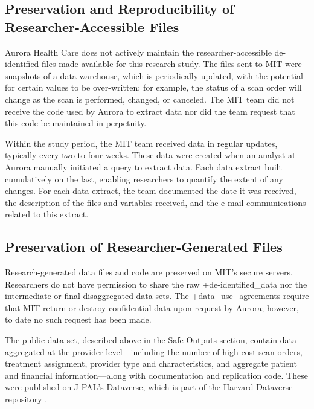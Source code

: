 \documentclass[
]{book}
\begin{document}
\hypertarget{preservation-and-reproducibility-of-researcher-accessible-files-3}{%
\subsection{Preservation and Reproducibility of Researcher-Accessible Files}\label{preservation-and-reproducibility-of-researcher-accessible-files-3}}

Aurora Health Care does not actively maintain the researcher-accessible de-identified files made available for this research study. The files sent to MIT were snapshots of a data warehouse, which is periodically updated, with the potential for certain values to be over-written; for example, the status of a scan order will change as the scan is performed, changed, or canceled. The MIT team did not receive the code used by Aurora to extract data nor did the team request that this code be maintained in perpetuity.

Within the study period, the MIT team received data in regular updates, typically every two to four weeks. These data were created when an analyst at Aurora manually initiated a query to extract data. Each data extract built cumulatively on the last, enabling researchers to quantify the extent of any changes. For each data extract, the team documented the date it was received, the description of the files and variables received, and the e-mail communications related to this extract.

\hypertarget{preservation-of-researcher-generated-files}{%
\subsection{Preservation of Researcher-Generated Files}\label{preservation-of-researcher-generated-files}}

Research-generated data files and code are preserved on MIT's secure servers. Researchers do not have permission to share the raw +de-identified\_data\textbar{} nor the intermediate or final disaggregated data sets. The +data\_use\_agreements\textbar{} require that MIT return or destroy confidential data upon request by Aurora; however, to date no such request has been made.

The public data set, described above in the \protect\hyperlink{safe-outputs-8}{Safe Outputs} section, contain data aggregated at the provider level---including the number of high-cost scan orders, treatment assignment, provider type and characteristics, and aggregate patient and financial information---along with documentation and replication code. These were published on \href{https://doi.org/10.7910/DVN/BRKDVQ}{J-PAL's Dataverse}, which is part of the Harvard Dataverse repository \citep{doyle2018}.
\end{document}
